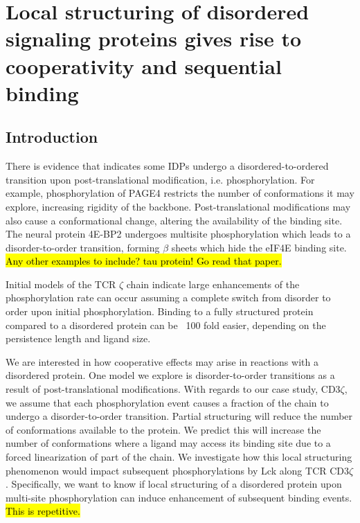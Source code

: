 \documentclass[../../AdvancementSummary.tex]{subfiles}
\begin{document}
\section{Local structuring of disordered signaling proteins gives rise to cooperativity and sequential binding}
\label{sec:LocalStruct}


\subsection{Introduction}


There is evidence that indicates some IDPs undergo a disordered-to-ordered transition upon post-translational modification, i.e. phosphorylation. For example, phosphorylation of PAGE4 restricts the number of conformations it may explore, increasing rigidity of the backbone.\cite{He2015} Post-translational modifications may also cause a conformational change, altering the availability of the binding site.  The neural protein 4E-BP2 undergoes multisite phosphorylation which leads to a disorder-to-order transition, forming $\beta$ sheets which hide the eIF4E binding site. \cite{Bah2015} \hl{Any other examples to include? tau protein! Go read that paper.} 

Initial models of the TCR $\zeta$ chain indicate large enhancements of the phosphorylation rate can occur assuming a complete switch from disorder to order upon initial phosphorylation. Binding to a fully structured protein compared to a disordered protein can be ~100 fold easier, depending on the persistence length and ligand size. \cite{Mukhopadhyay2016}


We are interested in how cooperative effects may arise in reactions with a disordered protein. One model we explore is disorder-to-order transitions as a result of post-translational modifications. With regards to our case study, CD3$\zeta$, we assume that each phosphorylation event causes a fraction of the chain to undergo a disorder-to-order transition. Partial structuring will reduce the number of conformations available to the protein. We predict this will increase the number of conformations where a ligand may access its binding site due to a forced linearization of part of the chain. We investigate how this local structuring phenomenon would impact subsequent phosphorylations by Lck along TCR CD3$\zeta$. Specifically, we want to know if local structuring of a disordered protein upon multi-site phosphorylation can induce enhancement of subsequent binding events. \hl{This is repetitive.}
\end{document}
